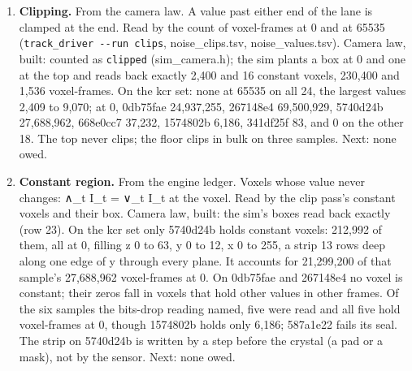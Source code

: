 \begin{enumerate}
\item \textbf{Clipping.} From the camera law. A value past either end of the lane is clamped at the end. Read by the count of voxel-frames at 0 and at 65535 (\texttt{track\_\allowbreak{}driver -\allowbreak{}-\allowbreak{}run clips}, noise\_\allowbreak{}clips.tsv, noise\_\allowbreak{}values.tsv). Camera law, built: counted as \texttt{clipped} (sim\_\allowbreak{}camera.h); the sim plants a box at 0 and one at the top and reads back exactly 2,400 and 16 constant voxels, 230,400 and 1,536 voxel-frames. On the kcr set: none at 65535 on all 24, the largest values 2,409 to 9,070; at 0, 0db75fae 24,937,255, 267148e4 69,500,929, 5740d24b 27,688,962, 668e0cc7 37,232, 1574802b 6,186, 341df25f 83, and 0 on the other 18. The top never clips; the floor clips in bulk on three samples. Next: none owed.
\item \textbf{Constant region.} From the engine ledger. Voxels whose value never changes: ∧\_\allowbreak{}t I\_\allowbreak{}t = ∨\_\allowbreak{}t I\_\allowbreak{}t at the voxel. Read by the clip pass's constant voxels and their box. Camera law, built: the sim's boxes read back exactly (row 23). On the kcr set only 5740d24b holds constant voxels: 212,992 of them, all at 0, filling z 0 to 63, y 0 to 12, x 0 to 255, a strip 13 rows deep along one edge of y through every plane. It accounts for 21,299,200 of that sample's 27,688,962 voxel-frames at 0. On 0db75fae and 267148e4 no voxel is constant; their zeros fall in voxels that hold other values in other frames. Of the six samples the bits-drop reading named, five were read and all five hold voxel-frames at 0, though 1574802b holds only 6,186; 587a1e22 fails its seal. The strip on 5740d24b is written by a step before the crystal (a pad or a mask), not by the sensor. Next: none owed.

\end{enumerate}
